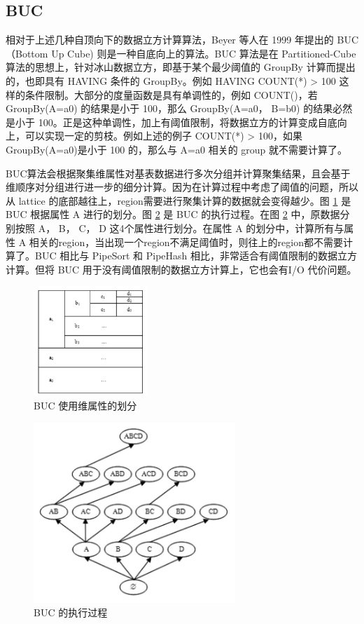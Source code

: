 \subsection{BUC}

相对于上述几种自顶向下的数据立方计算算法，Beyer 等人在 1999 年提出的 BUC （Bottom Up Cube) 则是一种自底向上的算法。BUC 算法是在 Partitioned-Cube 算法的思想上，针对冰山数据立方，即基于某个最少阈值的 GroupBy 计算而提出的，也即具有 HAVING 条件的 GroupBy。例如 HAVING COUNT(*) > 100 这样的条件限制。大部分的度量函数是具有单调性的，例如 COUNT()，若 GroupBy(A=a0) 的结果是小于 100，那么 GroupBy(A=a0， B=b0) 的结果必然是小于 100。正是这种单调性，加上有阈值限制，将数据立方的计算变成自底向上，可以实现一定的剪枝。例如上述的例子 COUNT(*) > 100，如果 GroupBy(A=a0)是小于 100 的，那么与 A=a0 相关的 group 就不需要计算了。

BUC算法会根据聚集维属性对基表数据进行多次分组并计算聚集结果，且会基于维顺序对分组进行进一步的细分计算。因为在计算过程中考虑了阈值的问题，所以从 lattice 的底部越往上，region需要进行聚集计算的数据就会变得越少。图 \ref{BUC_partition} 是 BUC 根据属性 A 进行的划分。图 \ref{BUC_execution} 是 BUC 的执行过程。在图 \ref{BUC_execution} 中，原数据分别按照 A， B， C， D 这4个属性进行划分。在属性 A 的划分中，计算所有与属性 A 相关的region，当出现一个region不满足阈值时，则往上的region都不需要计算了。BUC 相比与 PipeSort 和 PipeHash 相比，非常适合有阈值限制的数据立方计算。但将 BUC 用于没有阈值限制的数据立方计算上，它也会有I/O 代价问题。

\begin{figure}[!htb]
\centering\includegraphics[width=1.7in]{picture/ch_current_research/BUC_partition} 
\caption{BUC 使用维属性的划分}\label{BUC_partition} 
\end{figure} 


\begin{figure}[!htb]
\centering\includegraphics[width=3in]{picture/ch_current_research/BUC_execution} 
\caption{BUC 的执行过程}\label{BUC_execution} 
\end{figure} 



